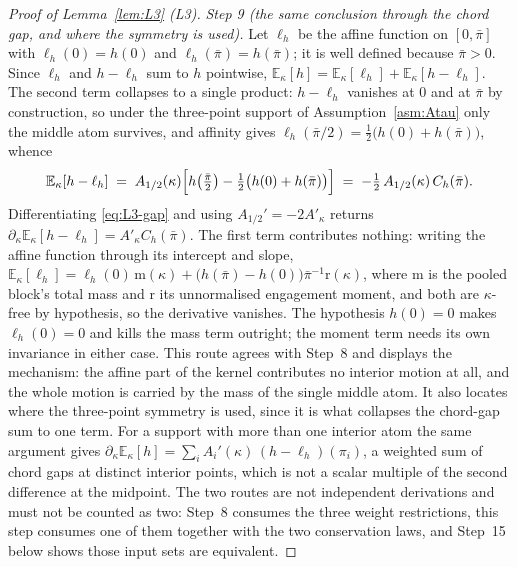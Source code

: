 \documentclass[11pt]{article}
\newcommand{\Eop}{\mathbb{E}}
\newcommand{\Akap}{A'_{\kappa}}
\begin{document}
\begin{proof}[Proof of Lemma~\ref{lem:L3} (L3)]
\emph{Step 9 (the same conclusion through the chord gap, and where the symmetry is used).} Let
$\ell_h$ be the affine function on $[0,\bar\pi]$ with $\ell_h(0) = h(0)$ and
$\ell_h(\bar\pi) = h(\bar\pi)$; it is well defined because $\bar\pi > 0$. Since $\ell_h$ and
$h-\ell_h$ sum to $h$ pointwise, $\Eop_\kappa[h] = \Eop_\kappa[\ell_h] + \Eop_\kappa[h-\ell_h]$. The
second term collapses to a single product: $h-\ell_h$ vanishes at $0$ and at $\bar\pi$ by
construction, so under the three-point support of Assumption~\ref{asm:Atau} only the middle atom
survives, and affinity gives $\ell_h(\bar\pi/2) = \tfrac12\bigl(h(0)+h(\bar\pi)\bigr)$, whence
\begin{equation}
\label{eq:L3-gap}
\Eop_\kappa[h-\ell_h]
 \;=\; A_{1/2}(\kappa)\Bigl[h\!\left(\tfrac{\bar\pi}{2}\right)
   - \tfrac12\bigl(h(0)+h(\bar\pi)\bigr)\Bigr]
 \;=\; -\tfrac12\,A_{1/2}(\kappa)\,C_h(\bar\pi).
\end{equation}
Differentiating \eqref{eq:L3-gap} and using $A_{1/2}' = -2\Akap$ returns
$\partial_\kappa\Eop_\kappa[h-\ell_h] = \Akap C_h(\bar\pi)$. The first term contributes nothing:
writing the affine function through its intercept and slope,
$\Eop_\kappa[\ell_h] = \ell_h(0)\,\mathrm{m}(\kappa) + \bigl(h(\bar\pi)-h(0)\bigr)\bar\pi^{-1}
\mathrm{r}(\kappa)$, where $\mathrm{m}$ is the pooled block's total mass and $\mathrm{r}$ its
unnormalised engagement moment, and both are $\kappa$-free by hypothesis, so the derivative vanishes.
The hypothesis $h(0)=0$ makes $\ell_h(0) = 0$ and kills the mass term outright; the moment term needs
its own invariance in either case. This route agrees with Step~8 and displays the mechanism: the
affine part of the kernel contributes no interior motion at all, and the whole motion is carried by
the mass of the single middle atom. It also locates where the three-point symmetry is used, since it
is what collapses the chord-gap sum to one term. For a support with more than one interior atom the
same argument gives $\partial_\kappa\Eop_\kappa[h] = \sum_i A_i'(\kappa)\,(h-\ell_h)(\pi_i)$, a
weighted sum of chord gaps at distinct interior points, which is not a scalar multiple of the second
difference at the midpoint. The two routes are not independent derivations and must not be counted as
two: Step~8 consumes the three weight restrictions, this step consumes one of them together with the
two conservation laws, and Step~15 below shows those input sets are equivalent.


\end{proof}
\end{document}
